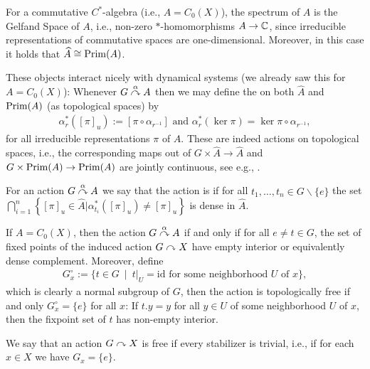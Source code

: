 \begin{remark}
	For a commutative $C^*$-algebra (i.e., $A = C_0(X)$), the spectrum of $A$ is the Gelfand Space of $A$, i.e., non-zero $*$-homomorphisms $A \to \mathbb{C}$, since irreducible representations of commutative spaces are one-dimensional. Moreover, in this case it holds that $\widehat{A} \cong \mathrm{Prim}(A)$.
\end{remark}
These objects interact nicely with dynamical systems (we already saw this for $A= C_0(X)$): Whenever $G \stackrel{\alpha}{\curvearrowright} A$ then we may define the  on both $\hat A$ and $\mathrm{Prim}(A)$ (as topological spaces) by
\begin{align*}
	\alpha_r^*([\pi]_u) := [\pi \circ \alpha_{r^{-1}}] \text{ and } \alpha_{r}^*(\ker \pi) = \ker \pi \circ \alpha_{r^{-1}},
\end{align*}
for all irreducible representations $\pi$ of $A$. These are indeed actions on topological spaces, i.e., the corresponding maps out of $G \times \hat A \to \hat A$ and $G \times \mathrm{Prim}(A) \to \mathrm{Prim}(A)$ are jointly continuous, see e.g., \cite[Lemma 7.1]{williamsmorita}.
\begin{definition}
	For an action $G \stackrel{\alpha}{\curvearrowright} A$ we say that the action is  if for all $t_1,\dots,t_n \in G\backslash\{e\}$ the set $\bigcap_{i=1}^n \left\{ [\pi]_u \in \hat A | \alpha_{t_i}^*([\pi]_u)\neq [\pi]_u \right\}$ is dense in $\hat A$.
\end{definition}
\begin{remark}
	If $A=C_0(X)$, then the action $G \stackrel{\alpha}{\curvearrowright} A$ if and only if for all $e \neq t \in G$, the set of fixed points of the induced action $G \stackrel{}{\curvearrowright} X$ have empty interior or equivalently dense complement. Moreover, define 
	\begin{align*}
		G_x^\circ := \{t \in G \ \mid \ t|_U = \mathrm{id} \text{ for some neighborhood } U \text{ of } x\},
	\end{align*}
	which is clearly a normal subgroup of $G$, then the action is topologically free if and only $G_x^\circ = \{e\}$ for all $x$: If $t.y= y$ for all $y \in U$ of some neighborhood $U$ of $x$, then the fixpoint set of $t$ has non-empty interior.
\end{remark}
\begin{definition}
	We say that an action $G \stackrel{}{\curvearrowright} X$ is free if every stabilizer is trivial, i.e., if for each $x \in X$ we have $G_x = \{e\}$.
\end{definition}
